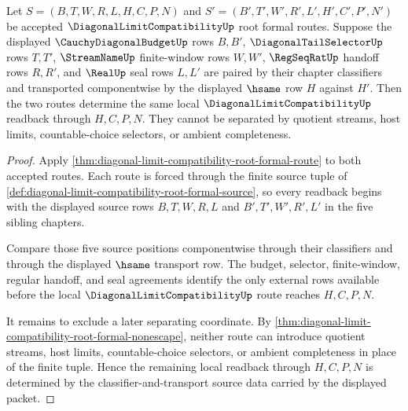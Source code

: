 \begin{theorem}
\label{thm:diagonal-limit-compatibility-root-readback-determinacy}
Let $S=(B,T,W,R,L,H,C,P,N)$ and $S'=(B',T',W',R',L',H',C',P',N')$ be accepted $\DiagonalLimitCompatibilityUp$ root formal routes. Suppose the displayed $\CauchyDiagonalBudgetUp$ rows $B,B'$, $\DiagonalTailSelectorUp$ rows $T,T'$, $\StreamNameUp$ finite-window rows $W,W'$, $\RegSeqRatUp$ handoff rows $R,R'$, and $\RealUp$ seal rows $L,L'$ are paired by their chapter classifiers and transported componentwise by the displayed $\hsame$ row $H$ against $H'$. Then the two routes determine the same local $\DiagonalLimitCompatibilityUp$ readback through $H,C,P,N$. They cannot be separated by quotient streams, host limits, countable-choice selectors, or ambient completeness.
\end{theorem}
\begin{proof}
Apply \autoref{thm:diagonal-limit-compatibility-root-formal-route} to both accepted routes. Each route is forced through the finite source tuple of \autoref{def:diagonal-limit-compatibility-root-formal-source}, so every readback begins with the displayed source rows $B,T,W,R,L$ and $B',T',W',R',L'$ in the five sibling chapters.

Compare those five source positions componentwise through their classifiers and through the displayed $\hsame$ transport row. The budget, selector, finite-window, regular handoff, and seal agreements identify the only external rows available before the local $\DiagonalLimitCompatibilityUp$ route reaches $H,C,P,N$.

It remains to exclude a later separating coordinate. By \autoref{thm:diagonal-limit-compatibility-root-formal-nonescape}, neither route can introduce quotient streams, host limits, countable-choice selectors, or ambient completeness in place of the finite tuple. Hence the remaining local readback through $H,C,P,N$ is determined by the classifier-and-transport source data carried by the displayed packet.
\end{proof}

